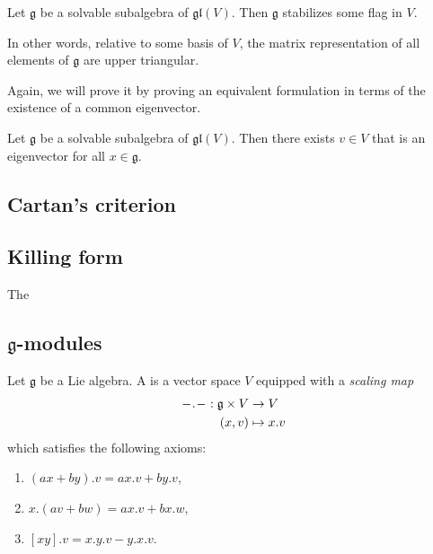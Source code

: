 \documentclass{article}
\newcommand*\wc{{\mkern 1mu-\mkern 1mu}}
\newcommand{\lb}[1]{\ensuremath{\left[{#1}\right]}}
\newcommand{\frkg}{{\ensuremath{\mathfrak{g}}}}
\newcommand{\glalg}{\ensuremath{\mathfrak{gl}}}
\begin{document}
\begin{theorem}
    Let $\frkg$ be a solvable subalgebra of $\glalg(V)$.
    Then $\frkg$ stabilizes some flag in $V$.
\end{theorem}

In other words, relative to some basis of $V$, the matrix representation of all elements of $\frkg$ are upper triangular.

Again, we will prove it by proving an equivalent formulation in terms of the existence of a common eigenvector.

\begin{theorem}
    Let $\frkg$ be a solvable subalgebra of $\glalg(V)$.
    Then there exists $v \in V$ that is an eigenvector for all $x \in \frkg$.
\end{theorem}

\subsection{Cartan's criterion}

\begin{theorem}
\end{theorem}

\subsection{Killing form}

\begin{definition}
    The 
\end{definition}

\subsection{\texorpdfstring{$\frkg$}{g}-modules}

\begin{definition}
    Let $\frkg$ be a Lie algebra.
    A \defstyle{$\frkg$-module} is a vector space $V$ equipped with a \textit{scaling map}
    \begin{align*}
        \wc . \wc:
        \frkg \times V
        &\to
        V
        \\
        (x, v)
        &\mapsto
        x.v
    \end{align*}
    which satisfies the following axioms:
    \begin{enumerate}[label=(M\arabic*)]
        \item \label{ax:ModuleLeftDistribute}
            $(ax + by).v  = ax.v + by.v$,
        \item \label{ax:ModuleRightDistribute}
            $x.(av + bw) = ax.v + bx.w$,
        \item \label{ax:ModuleBracket}
            $\lb{xy}.v = x.y.v - y.x.v$.
    \end{enumerate}

\end{definition}
\end{document}
